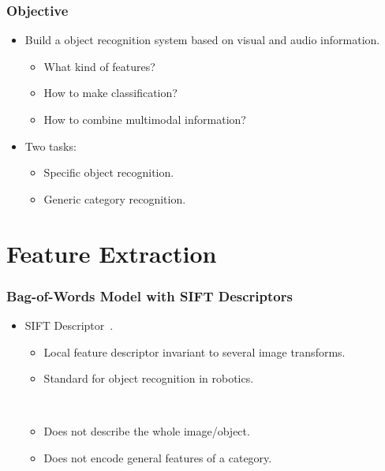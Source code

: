 \documentclass{beamer}
\begin{document}
\begin{frame}
  \frametitle{Objective}

  \begin{itemize}
    \item Build a object recognition system based on visual and audio information.
      \begin{itemize}
        \item What kind of features?
        \item How to make classification?
        \item How to combine multimodal information?
      \end{itemize}
    \item Two tasks:
      \begin{itemize}
        \item Specific object recognition.
        \item Generic category recognition.
      \end{itemize}
  \end{itemize}
\end{frame}

\section{Feature Extraction}
\begin{frame}
  \frametitle{Bag-of-Words Model with SIFT Descriptors}

  \begin{itemize}
    \item SIFT Descriptor~\cite{lowe_object_1999}. 
      \begin{itemize}
        \item Local feature descriptor invariant to several image transforms.
        \item Standard for object recognition in robotics.

          ~
        \item Does not describe the whole image/object.
        \item Does not encode general features of a category.
      \end{itemize}
      ~
  \end{itemize}
\end{frame}
\end{document}
